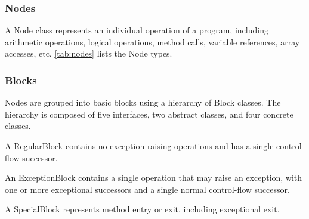 \subsubsection{Nodes}
\label{sec:node_classes}

    A Node class represents an individual operation of a program, including arithmetic operations, logical operations, method calls, variable references, array accesses, etc.  \autoref{tab:nodes} lists the Node types.


\subsubsection{Blocks}
\label{sec:block_classes}

    Nodes are grouped into basic blocks using a hierarchy of Block classes.  The hierarchy is composed of five interfaces, two abstract classes, and four concrete classes.  

    



    A RegularBlock contains no exception-raising operations and has a single control-flow successor.

        
        
    An ExceptionBlock contains a single operation that may raise an exception, with one or more exceptional successors and a single normal control-flow successor.
            

        
    A SpecialBlock represents method entry or exit, including exceptional exit.

